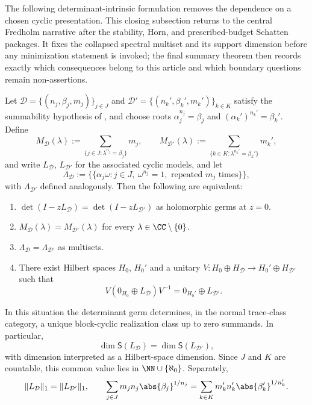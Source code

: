 The following determinant-intrinsic formulation removes the dependence on a
chosen cyclic presentation.  This closing subsection returns to the central
Fredholm narrative after the stability, Horn, and prescribed-budget Schatten
packages.  It fixes the collapsed spectral multiset and its support dimension
before any minimization statement is invoked; the final summary theorem then
records exactly which consequences belong to this article and which boundary
questions remain non-assertions.
\begin{theorem}
  \label{thm:cyclic-data-classification}
  Let \(\mathcal D=\{(n_j,\beta_j,m_j)\}_{j\in J}\) and
  \(\mathcal D'=\{(n_k',\beta_k',m_k')\}_{k\in K}\) satisfy the summability
  hypothesis of , and choose roots
  \(\alpha_j^{n_j}=\beta_j\) and \((\alpha_k')^{n_k'}=\beta_k'\). Define
  \[
    M_{\mathcal D}(\lambda)
    :=\sum_{\{j\in J:\lambda^{n_j}=\beta_j\}} m_j,
    \qquad
    M_{\mathcal D'}(\lambda)
    :=\sum_{\{k\in K:\lambda^{n_k'}=\beta_k'\}} m_k',
  \]
  and write
  \(L_{\mathcal D}\), \(L_{\mathcal D'}\) for the associated cyclic models,
  and let
  \[
    \Lambda_{\mathcal D}
    :=
    \bigl\{\!\bigl\{\alpha_j\omega:
      j\in J,\ \omega^{n_j}=1,\text{ repeated }m_j\text{ times}
    \bigr\}\!\bigr\},
  \]
  with \(\Lambda_{\mathcal D'}\) defined analogously. Then the following are
  equivalent:
  \begin{enumerate}[label=\textup{(\roman*)}]
    \item \(\det(I-zL_{\mathcal D})=\det(I-zL_{\mathcal D'})\) as holomorphic
      germs at \(z=0\).
    \item \(M_{\mathcal D}(\lambda)=M_{\mathcal D'}(\lambda)\) for every
      \(\lambda\in\CC\setminus\{0\}\).
    \item \(\Lambda_{\mathcal D}=\Lambda_{\mathcal D'}\) as multisets.
    \item There exist Hilbert spaces \(H_0\), \(H_0'\) and a unitary
      \(V:H_0\oplus H_{\mathcal D}\to H_0'\oplus H_{\mathcal D'}\) such that
      \[
        V(0_{H_0}\oplus L_{\mathcal D})V^{-1}
        =0_{H_0'}\oplus L_{\mathcal D'}.
      \]
  \end{enumerate}
  In this situation the determinant germ determines, in the normal
  trace-class category, a unique block-cyclic realization class up to zero
  summands. In particular,
  \[
    \dim \mathsf S(L_{\mathcal D})
    =\dim \mathsf S(L_{\mathcal D'}),
  \]
  with dimension interpreted as a Hilbert-space dimension. Since \(J\) and
  \(K\) are countable, this common value lies in
  \(\NN\cup\{\aleph_0\}\). Separately,
  \[
    \|L_{\mathcal D}\|_1=\|L_{\mathcal D'}\|_1,
    \qquad
    \sum_{j\in J}m_jn_j\abs{\beta_j}^{1/n_j}
    =\sum_{k\in K}m_k'n_k'\abs{\beta_k'}^{1/n_k'}.
  \]
\end{theorem}

